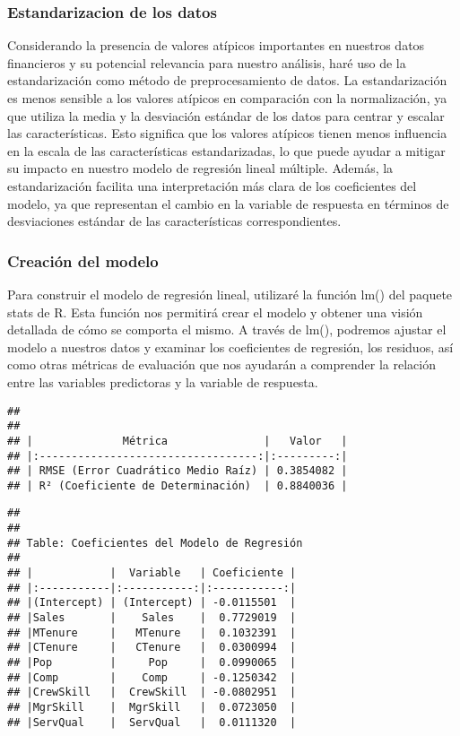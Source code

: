 \documentclass[
]{article}
\begin{document}
\hypertarget{estandarizacion-de-los-datos}{%
\subsubsection{Estandarizacion de los
datos}\label{estandarizacion-de-los-datos}}

Considerando la presencia de valores atípicos importantes en nuestros
datos financieros y su potencial relevancia para nuestro análisis, haré
uso de la estandarización como método de preprocesamiento de datos. La
estandarización es menos sensible a los valores atípicos en comparación
con la normalización, ya que utiliza la media y la desviación estándar
de los datos para centrar y escalar las características. Esto significa
que los valores atípicos tienen menos influencia en la escala de las
características estandarizadas, lo que puede ayudar a mitigar su impacto
en nuestro modelo de regresión lineal múltiple. Además, la
estandarización facilita una interpretación más clara de los
coeficientes del modelo, ya que representan el cambio en la variable de
respuesta en términos de desviaciones estándar de las características
correspondientes.

\hypertarget{creaciuxf3n-del-modelo}{%
\subsubsection{Creación del modelo}\label{creaciuxf3n-del-modelo}}

Para construir el modelo de regresión lineal, utilizaré la función lm()
del paquete stats de R. Esta función nos permitirá crear el modelo y
obtener una visión detallada de cómo se comporta el mismo. A través de
lm(), podremos ajustar el modelo a nuestros datos y examinar los
coeficientes de regresión, los residuos, así como otras métricas de
evaluación que nos ayudarán a comprender la relación entre las variables
predictoras y la variable de respuesta.

\begin{verbatim}
## 
## 
## |              Métrica               |   Valor   |
## |:----------------------------------:|:---------:|
## | RMSE (Error Cuadrático Medio Raíz) | 0.3854082 |
## | R² (Coeficiente de Determinación)  | 0.8840036 |
\end{verbatim}

\begin{verbatim}
## 
## 
## Table: Coeficientes del Modelo de Regresión
## 
## |            |  Variable   | Coeficiente |
## |:-----------|:-----------:|:-----------:|
## |(Intercept) | (Intercept) | -0.0115501  |
## |Sales       |    Sales    |  0.7729019  |
## |MTenure     |   MTenure   |  0.1032391  |
## |CTenure     |   CTenure   |  0.0300994  |
## |Pop         |     Pop     |  0.0990065  |
## |Comp        |    Comp     | -0.1250342  |
## |CrewSkill   |  CrewSkill  | -0.0802951  |
## |MgrSkill    |  MgrSkill   |  0.0723050  |
## |ServQual    |  ServQual   |  0.0111320  |
\end{verbatim}
\end{document}

